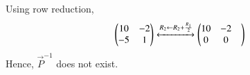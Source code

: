 Using row reduction, 
%
\begin{align}
\begin{pmatrix}10 & -2 \\-5 & 1\end{pmatrix}
\xleftrightarrow {R_2 \leftarrow R_2+\frac{R_1}{2}}\begin{pmatrix}10& -2& \\0 & 0\end{pmatrix}
\end{align} 
Hence,  $\vec {P}^{-1} $ does not exist.